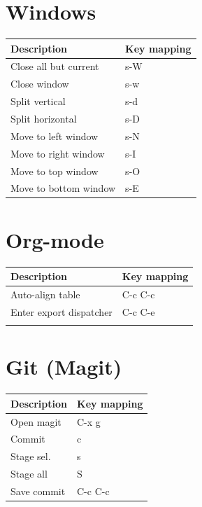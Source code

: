 \documentclass[11pt]{article}
\begin{document}
\section{Windows}
\label{sec:orga18e020}

\begin{center}
\begin{tabular}{ll}
Description & Key mapping\\
\hline
Close all but current & s-W\\
Close window & s-w\\
Split vertical & s-d\\
Split horizontal & s-D\\
Move to left window & s-N\\
Move to right window & s-I\\
Move to top window & s-O\\
Move to bottom window & s-E\\
\end{tabular}
\end{center}
\section{Org-mode}
\label{sec:orgf957d0e}

\begin{center}
\begin{tabular}{ll}
Description & Key mapping\\
\hline
Auto-align table & C-c C-c\\
Enter export dispatcher & C-c C-e\\
 & \\
\end{tabular}
\end{center}
\section{Git (Magit)}
\label{sec:orgb4cbef2}

\begin{center}
\begin{tabular}{ll}
Description & Key mapping\\
\hline
Open magit & C-x g\\
Commit & c\\
Stage sel. & s\\
Stage all & S\\
Save commit & C-c C-c\\
\end{tabular}
\end{center}
\end{document}
